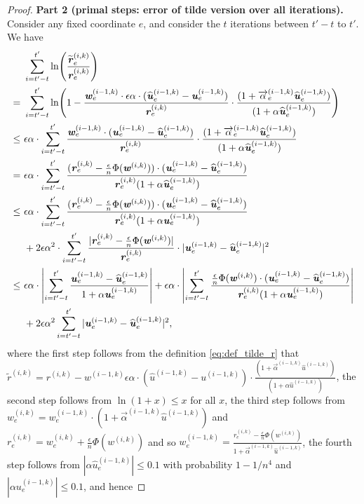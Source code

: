 \documentclass[11pt]{article}
\let\originalleft\left
\let\originalright\right
\renewcommand{\left}{\mathopen{}\mathclose\bgroup\originalleft}
\renewcommand{\right}{\aftergroup\egroup\originalright}
\newcommand\rr{\boldsymbol{\mathit{r}}}
\newcommand\uu{\boldsymbol{\mathit{u}}}
\newcommand\ww{\boldsymbol{\mathit{w}}}
\newcommand{\wh}{\widehat}
\newcommand{\wt}{\widetilde}
\begin{document}
\begin{proof}
{\bf Part 2 (primal steps: error of tilde version over all iterations).}
Consider any fixed coordinate $e$, and consider the $t$ iterations between $t'-t$ to $t'$. We have
\begin{align}\label{eq:robust_stability}
&~ \sum_{i = t'-t}^{t'} \ln\left(\frac{\wt{\rr}_e^{(i,k)}}{\rr_e^{(i,k)}}\right) \notag \\
= &~ \sum_{i = t'-t}^{t'} \ln\left( 1 - \frac{\ww_e^{(i-1,k)} \cdot \epsilon \alpha \cdot ( \wh{\uu}_e^{(i-1,k)} - \uu_e^{(i-1,k)})}{\rr_e^{(i,k)}} \cdot \frac{(1 + \overrightarrow{\alpha}_e^{(i-1,k)} \wh{\uu}_e^{(i-1,k)})}{(1 + \alpha \wh{\uu}_e^{(i-1,k)})} \right) \notag \\
\leq &~ \epsilon \alpha \cdot \sum_{i = t'-t}^{t'} \frac{\ww_e^{(i-1,k)} \cdot ( \uu_e^{(i-1,k)} - \wh{\uu}_e^{(i-1,k)})}{\rr_e^{(i,k)}} \cdot \frac{(1 + \overrightarrow{\alpha}_e^{(i-1,k)} \wh{\uu}_e^{(i-1,k)})}{(1 + \alpha \wh{\uu}_e^{(i-1,k)})} \notag \\
= &~ \epsilon \alpha \cdot \sum_{i = t'-t}^{t'} \frac{(\rr_e^{(i,k)} - \frac{\epsilon}{n} \Phi(\ww^{(i,k)})) \cdot ( \uu_e^{(i-1,k)} - \wh{\uu}_e^{(i-1,k)})}{\rr_e^{(i,k)} (1 + \alpha \wh{\uu}_e^{(i-1,k)})} \notag \\
\leq &~ \epsilon \alpha \cdot \sum_{i = t'-t}^{t'} \frac{(\rr_e^{(i,k)} - \frac{\epsilon}{n} \Phi(\ww^{(i,k)})) \cdot ( \uu_e^{(i-1,k)} - \wh{\uu}_e^{(i-1,k)})}{\rr_e^{(i,k)} (1 + \alpha \uu_e^{(i-1,k)})}  \notag \\
&~ + 2 \epsilon \alpha^2 \cdot \sum_{i = t'-t}^{t'} \frac{| \rr_e^{(i,k)} - \frac{\epsilon}{n} \Phi(\ww^{(i,k)})|}{\rr_e^{(i,k)}} \cdot |  \uu_e^{(i-1,k)} - \wh{\uu}_e^{(i-1,k)}|^2 \notag \\
\leq &~ \epsilon \alpha \cdot \left|\sum_{i = t'-t}^{t'} \frac{\uu_e^{(i-1,k)} - \wh{\uu}_e^{(i-1,k)}}{1 + \alpha \uu_e^{(i-1,k)}}\right| + \epsilon \alpha \cdot \left|\sum_{i = t'-t}^{t'} \frac{\frac{\epsilon}{n} \Phi(\ww^{(i,k)}) \cdot ( \uu_e^{(i-1,k)} - \wh{\uu}_e^{(i-1,k)})}{\rr_e^{(i,k)} (1 + \alpha \uu_e^{(i-1,k)})}\right| \notag \\
&~ + 2 \epsilon \alpha^2 \sum_{i = t'-t}^{t'} | \uu_e^{(i-1,k)} - \wh{\uu}_e^{(i-1,k)}|^2,
\end{align}
where the first step follows from the definition \eqref{eq:def_tilde_r} that $\wt{\rr}^{(i,k)} = \rr^{(i,k)} - \ww^{(i-1,k)} \epsilon \alpha \cdot ( \wh{\uu}^{(i-1,k)} - \uu^{(i-1,k)}) \cdot \frac{(1 + \overrightarrow{\alpha}^{(i-1,k)} \wh{\uu}^{(i-1,k)})}{(1 + \alpha \wh{\uu}^{(i-1,k)})}$,
the second step follows from $\ln(1+x) \leq x$ for all $x$, the third step follows from $\ww_e^{(i,k)} = \ww_e^{(i-1,k)} \cdot (1 + \overrightarrow{\alpha}^{(i-1,k)} \wh{\uu}^{(i-1,k)})$ and $\rr_e^{(i,k)} = \ww_e^{(i,k)} + \frac{\epsilon}{n} \Phi(\ww^{(i,k)})$ and so $\ww_e^{(i-1,k)} = \frac{\rr_e^{(i,k)} - \frac{\epsilon}{n} \Phi(\ww^{(i,k)})}{1 + \overrightarrow{\alpha}^{(i-1,k)} \wh{\uu}^{(i-1,k)}}$, the fourth step follows from $|\alpha \wh{\uu}_e^{(i-1,k)}| \leq 0.1$ with probability $1-1/n^4$ and $|\alpha \uu_e^{(i-1,k)}| \leq 0.1$, and hence 

\end{proof}
\end{document}

